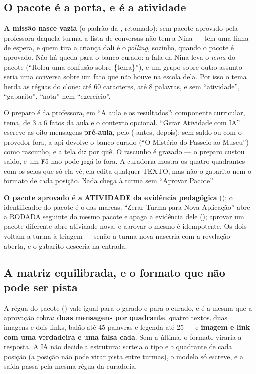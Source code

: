 \subsection{O pacote é a porta, e é a atividade}

\textbf{A missão nasce vazia} (o padrão da , retomado): sem pacote
aprovado pela professora daquela turma, a lista de conversas não tem a Nina ---
tem uma linha de espera, e quem tira a criança dali é o \emph{polling}, sozinho,
quando o pacote é aprovado. Não há queda para o banco curado: a fala da Nina
leva o \emph{tema} do pacote (\enquote{Rolou uma confusão sobre \{tema\}}), e
um grupo sobre outro assunto seria uma conversa sobre um fato que não houve na
escola dela. Por isso o tema herda as réguas do clone: até 60 caracteres, até 8
palavras, e sem \enquote{atividade}, \enquote{gabarito}, \enquote{nota} nem
\enquote{exercício}.

O preparo é da professora, em \enquote{A aula e os resultados}: componente
curricular, tema, de 3 a 6 fatos da aula e o contexto opcional. \enquote{Gerar
Atividade com IA} escreve as oito mensagens \textbf{pré-aula}, pelo
 ( antes,  depois); sem saldo ou com o
provedor fora, a api devolve o banco curado (\enquote{O Mistério do Passeio ao
Museu}) como rascunho, e a tela diz por quê. O rascunho é gravado --- o preparo
custou saldo, e um F5 não pode jogá-lo fora. A curadoria mostra os quatro
quadrantes com os selos que só ela vê; ela edita qualquer TEXTO, mas não o
gabarito nem o formato de cada posição. Nada chega à turma sem \enquote{Aprovar
Pacote}.

\textbf{O pacote aprovado é a ATIVIDADE da evidência pedagógica}
(): o identificador do pacote é o  das marcas.
\enquote{Zerar Turma para Nova Aplicação} abre a RODADA seguinte do mesmo
pacote e apaga a evidência dele ();
aprovar um pacote diferente abre atividade nova, e aprovar o mesmo é
idempotente. Os dois voltam a turma à triagem --- senão a turma nova nasceria
com a revelação aberta, e o gabarito desceria na entrada.

\subsection{A matriz equilibrada, e o formato que não pode ser pista}

A régua do pacote () vale igual para o
gerado e para o curado, e é a mesma que a aprovação cobra: \textbf{duas
mensagens por quadrante}, quatro textos, duas imagens e dois links, balão até
45 palavras e legenda até 25 --- e \textbf{imagem e link com uma verdadeira e
uma falsa cada}. Sem a última, o formato viraria a resposta. A IA não decide a
estrutura:  sorteia o tipo e o quadrante de cada posição (a
posição não pode virar pista entre turmas), o modelo só escreve, e a saída passa
pela mesma régua da curadoria.


